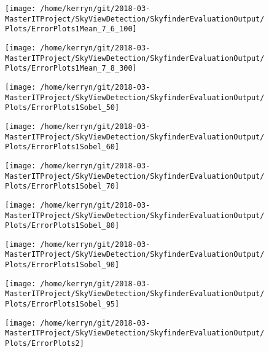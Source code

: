 \documentclass[final,3p,times,authoryear]{elsarticle}
\begin{document}
\begin{figure}
\centering
\texttt{[image: /home/kerryn/git/2018-03-MasterITProject/SkyViewDetection/SkyfinderEvaluationOutput/Plots/ErrorPlots1Mean\_7\_6\_100]}
\caption{}
\label{fig:errorplots1mean76100}
\end{figure}
\begin{figure}
\centering
\texttt{[image: /home/kerryn/git/2018-03-MasterITProject/SkyViewDetection/SkyfinderEvaluationOutput/Plots/ErrorPlots1Mean\_7\_8\_300]}
\caption{}
\label{fig:errorplots1mean78300}
\end{figure}
\begin{figure}
\centering
\texttt{[image: /home/kerryn/git/2018-03-MasterITProject/SkyViewDetection/SkyfinderEvaluationOutput/Plots/ErrorPlots1Sobel\_50]}
\caption{}
\label{fig:errorplots1sobel50}
\end{figure}
\begin{figure}
\centering
\texttt{[image: /home/kerryn/git/2018-03-MasterITProject/SkyViewDetection/SkyfinderEvaluationOutput/Plots/ErrorPlots1Sobel\_60]}
\caption{}
\label{fig:errorplots1sobel60}
\end{figure}
\begin{figure}
\centering
\texttt{[image: /home/kerryn/git/2018-03-MasterITProject/SkyViewDetection/SkyfinderEvaluationOutput/Plots/ErrorPlots1Sobel\_70]}
\caption{}
\label{fig:errorplots1sobel70}
\end{figure}
\begin{figure}
\centering
\texttt{[image: /home/kerryn/git/2018-03-MasterITProject/SkyViewDetection/SkyfinderEvaluationOutput/Plots/ErrorPlots1Sobel\_80]}
\caption{}
\label{fig:errorplots1sobel80}
\end{figure}
\begin{figure}
\centering
\texttt{[image: /home/kerryn/git/2018-03-MasterITProject/SkyViewDetection/SkyfinderEvaluationOutput/Plots/ErrorPlots1Sobel\_90]}
\caption{}
\label{fig:errorplots1sobel90}
\end{figure}
\begin{figure}
\centering
\texttt{[image: /home/kerryn/git/2018-03-MasterITProject/SkyViewDetection/SkyfinderEvaluationOutput/Plots/ErrorPlots1Sobel\_95]}
\caption{}
\label{fig:errorplots1sobel95}
\end{figure}
\begin{figure}
\centering
\texttt{[image: /home/kerryn/git/2018-03-MasterITProject/SkyViewDetection/SkyfinderEvaluationOutput/Plots/ErrorPlots2]}
\caption{}
\label{fig:errorplots2}
\end{figure}
\end{document}

